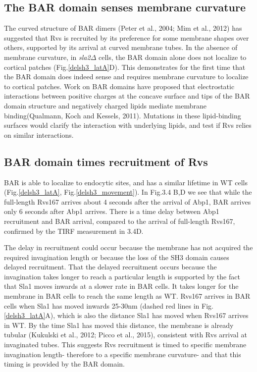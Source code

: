 \subsection{The BAR domain senses membrane curvature}
The curved structure of BAR dimers (Peter et al., 2004; Mim et al., 2012) has suggested that Rvs is recruited by its preference for some membrane shapes over others, supported by its arrival at curved membrane tubes. In the absence of membrane curvature, in \textit{sla2$\Delta$} cells, the BAR domain alone does not localize to cortical patches (Fig.\ref{delsh3_latA}D). This demonstrates for the first time that the BAR domain does indeed sense and requires membrane curvature to localize to cortical patches. Work on BAR domains have proposed that electrostatic interactions between positive charges at the concave surface and tips of the BAR domain structure and negatively charged lipids mediate membrane binding(Qualmann, Koch and Kessels, 2011). Mutations in these lipid-binding surfaces would clarify the interaction with underlying lipids, and test if Rvs relies on similar interactions.



\subsection{BAR domain times recruitment of Rvs} 

BAR is able to localize to endocytic sites, and has a similar lifetime in WT cells (Fig.\ref{delsh3_latA}, Fig.\ref{delsh3_movement}). In Fig.3.4 B,D we see that while the full-length Rvs167 arrives about 4 seconds after the arrival of Abp1, BAR arrives only 6 seconds after Abp1 arrives. There is a time delay between Abp1 recruitment and BAR arrival, compared to the arrival of full-length Rvs167, confirmed by the TIRF measurement in 3.4D. 

	\vspace{5mm}
The delay in recruitment could occur because the membrane has not acquired the required invagination length or because the loss of the SH3 domain causes delayed recruitment. That the delayed recruitment occurs because the invagination takes longer to reach a particular length is supported by the fact that Sla1 moves inwards at a slower rate in BAR cells. It takes longer for the membrane in BAR cells to reach the same length as WT. Rvs167 arrives in BAR cells when Sla1 has moved inwards 25-30nm (dashed red lines in Fig.\ref{delsh3_latA}A), which is also the distance Sla1 has moved when Rvs167 arrives in WT. By the time Sla1 has moved this distance, the membrane is already tubular (Kukulski et al., 2012; Picco et al., 2015), consistent with Rvs arrival at invaginated tubes. This suggests Rvs recruitment is timed to specific membrane invagination length- therefore to a specific membrane curvature- and that this timing is provided by the BAR domain. 



